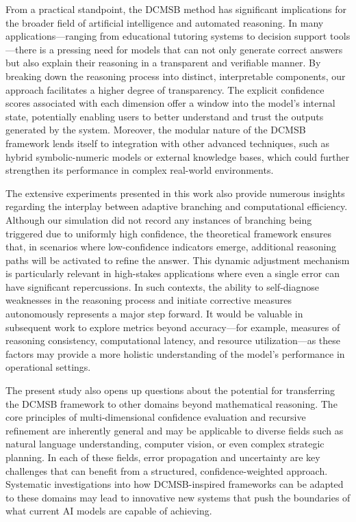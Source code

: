 \documentclass{article}
\begin{document}
From a practical standpoint, the DCMSB method has significant implications for the broader field of artificial intelligence and automated reasoning. In many applications—ranging from educational tutoring systems to decision support tools—there is a pressing need for models that can not only generate correct answers but also explain their reasoning in a transparent and verifiable manner. By breaking down the reasoning process into distinct, interpretable components, our approach facilitates a higher degree of transparency. The explicit confidence scores associated with each dimension offer a window into the model’s internal state, potentially enabling users to better understand and trust the outputs generated by the system. Moreover, the modular nature of the DCMSB framework lends itself to integration with other advanced techniques, such as hybrid symbolic-numeric models or external knowledge bases, which could further strengthen its performance in complex real-world environments.

The extensive experiments presented in this work also provide numerous insights regarding the interplay between adaptive branching and computational efficiency. Although our simulation did not record any instances of branching being triggered due to uniformly high confidence, the theoretical framework ensures that, in scenarios where low-confidence indicators emerge, additional reasoning paths will be activated to refine the answer. This dynamic adjustment mechanism is particularly relevant in high-stakes applications where even a single error can have significant repercussions. In such contexts, the ability to self-diagnose weaknesses in the reasoning process and initiate corrective measures autonomously represents a major step forward. It would be valuable in subsequent work to explore metrics beyond accuracy—for example, measures of reasoning consistency, computational latency, and resource utilization—as these factors may provide a more holistic understanding of the model’s performance in operational settings.

The present study also opens up questions about the potential for transferring the DCMSB framework to other domains beyond mathematical reasoning. The core principles of multi-dimensional confidence evaluation and recursive refinement are inherently general and may be applicable to diverse fields such as natural language understanding, computer vision, or even complex strategic planning. In each of these fields, error propagation and uncertainty are key challenges that can benefit from a structured, confidence-weighted approach. Systematic investigations into how DCMSB-inspired frameworks can be adapted to these domains may lead to innovative new systems that push the boundaries of what current AI models are capable of achieving.
\end{document}
